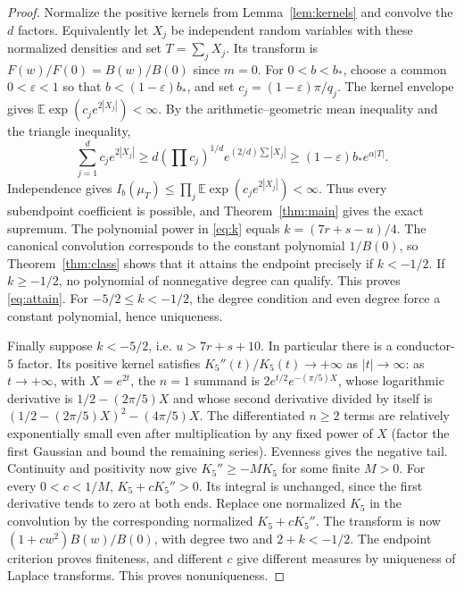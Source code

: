 \documentclass[11pt]{article}
\theoremstyle{remark}\newtheorem{remark}[theorem]{Remark}
\begin{document}
\begin{proof}
Normalize the positive kernels from Lemma~\ref{lem:kernels} and convolve the $d$ factors. Equivalently let $X_j$ be independent random variables with these normalized densities and set $T=\sum_j X_j$. Its transform is $F(w)/F(0)=B(w)/B(0)$ since $m=0$. For $0<b<b_*$, choose a common $0<\varepsilon<1$ so that $b<(1-\varepsilon)b_*$, and set $c_j=(1-\varepsilon)\pi/q_j$. The kernel envelope gives $\mathbb E\exp(c_j e^{2|X_j|})<\infty$. By the arithmetic--geometric mean inequality and the triangle inequality,
\[
 \sum_{j=1}^d c_j e^{2|X_j|}\ge d(\prod c_j)^{1/d}e^{(2/d)\sum |X_j|}
 \ge (1-\varepsilon)b_*e^{\alpha|T|}.
\]
Independence gives $I_b(\mu_T)\le\prod_j\mathbb E\exp(c_j e^{2|X_j|})<\infty$. Thus every subendpoint coefficient is possible, and Theorem~\ref{thm:main} gives the exact supremum. The polynomial power in \eqref{eq:k} equals $k=(7r+s-u)/4$. The canonical convolution corresponds to the constant polynomial $1/B(0)$, so Theorem~\ref{thm:class} shows that it attains the endpoint precisely if $k<-1/2$. If $k\ge-1/2$, no polynomial of nonnegative degree can qualify. This proves \eqref{eq:attain}. For $-5/2\le k<-1/2$, the degree condition and even degree force a constant polynomial, hence uniqueness.

Finally suppose $k<-5/2$, i.e. $u>7r+s+10$. In particular there is a conductor-$5$ factor. Its positive kernel satisfies $K_5''(t)/K_5(t)\to+\infty$ as $|t|\to\infty$: as $t\to+\infty$, with $X=e^{2t}$, the $n=1$ summand is $2e^{t/2}e^{-(\pi/5)X}$, whose logarithmic derivative is $1/2-(2\pi/5)X$ and whose second derivative divided by itself is $(1/2-(2\pi/5)X)^2-(4\pi/5)X$. The differentiated $n\ge2$ terms are relatively exponentially small even after multiplication by any fixed power of $X$ (factor the first Gaussian and bound the remaining series). Evenness gives the negative tail. Continuity and positivity now give $K_5''\ge-MK_5$ for some finite $M>0$. For every $0<c<1/M$, $K_5+cK_5''>0$. Its integral is unchanged, since the first derivative tends to zero at both ends. Replace one normalized $K_5$ in the convolution by the corresponding normalized $K_5+cK_5''$. The transform is now $(1+cw^2)B(w)/B(0)$, with degree two and $2+k<-1/2$. The endpoint criterion proves finiteness, and different $c$ give different measures by uniqueness of Laplace transforms. This proves nonuniqueness.
\end{proof}
\end{document}
